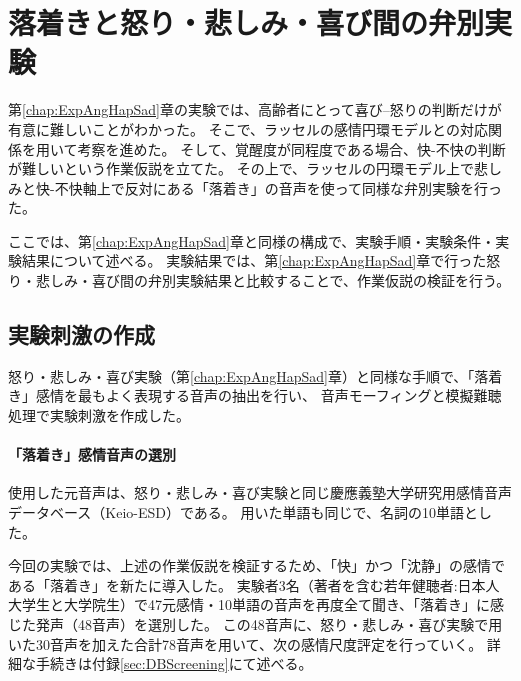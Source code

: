 \newpage
\chapter{落着きと怒り・悲しみ・喜び間の弁別実験}
\label{chap:ExpCalm}
第\ref{chap:ExpAngHapSad}章の実験では、高齢者にとって喜び--怒りの判断だけが有意に難しいことがわかった。
そこで、ラッセルの感情円環モデル\cite{russell1980circumplex}との対応関係を用いて考察を進めた。
そして、覚醒度が同程度である場合、快-不快の判断が難しいという作業仮説を立てた。
その上で、ラッセルの円環モデル上で悲しみと快-不快軸上で反対にある「落着き」の音声を使って同様な弁別実験を行った。

ここでは、第\ref{chap:ExpAngHapSad}章と同様の構成で、実験手順・実験条件・実験結果について述べる。
実験結果では、第\ref{chap:ExpAngHapSad}章で行った怒り・悲しみ・喜び間の弁別実験結果と比較することで、作業仮説の検証を行う。

\section{実験刺激の作成}
\label{sec:PrepareStimuli_cal}
怒り・悲しみ・喜び実験（第\ref{chap:ExpAngHapSad}章）と同様な手順で、「落着き」感情を最もよく表現する音声の抽出を行い、
音声モーフィングと模擬難聴処理で実験刺激を作成した。


\subsubsection{「落着き」感情音声の選別}
使用した元音声は、怒り・悲しみ・喜び実験と同じ慶應義塾大学研究用感情音声データベース（Keio-ESD）\cite{keioESD-J}である。
用いた単語も同じで、名詞の10単語とした。

今回の実験では、上述の作業仮説を検証するため、「快」かつ「沈静」の感情である「落着き」を新たに導入した。
実験者3名（著者を含む若年健聴者:日本人大学生と大学院生）で47元感情・10単語の音声を再度全て聞き、「落着き」に感じた発声（48音声）を選別した。
この48音声に、怒り・悲しみ・喜び実験で用いた30音声を加えた合計78音声を用いて、次の感情尺度評定を行っていく。
詳細な手続きは付録\ref{sec:DBScreening}にて述べる。

